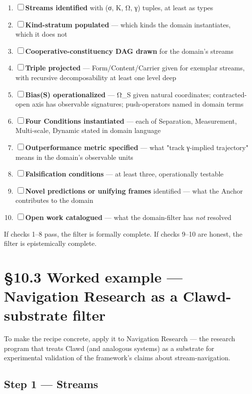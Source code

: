 \documentclass[11pt, openany]{book}
\newcommand{\sectionbreak}{\clearpage}
\begin{document}
\begin{enumerate}
\item ☐ \textbf{Streams identified} with (σ, K, Ω, γ) tuples, at least as types
\item ☐ \textbf{Kind-stratum populated} --- which kinds the domain instantiates, which it does not
\item ☐ \textbf{Cooperative-constituency DAG drawn} for the domain's streams
\item ☐ \textbf{Triple projected} --- Form/Content/Carrier given for exemplar streams, with recursive decomposability at least one level deep
\item ☐ \textbf{Bias(S) operationalized} --- Ω\_\allowbreak{}S given natural coordinates; contracted-open axis has observable signatures; push-operators named in domain terms
\item ☐ \textbf{Four Conditions instantiated} --- each of Separation, Measurement, Multi-scale, Dynamic stated in domain language
\item ☐ \textbf{Outperformance metric specified} --- what "track γ-implied trajectory" means in the domain's observable units
\item ☐ \textbf{Falsification conditions} --- at least three, operationally testable
\item ☐ \textbf{Novel predictions or unifying frames} identified --- what the Anchor contributes to the domain
\item ☐ \textbf{Open work catalogued} --- what the domain-filter has \textit{not} resolved
\end{enumerate}

If checks 1–8 pass, the filter is formally complete. If checks 9–10 are honest, the filter is epistemically complete.

\sectionbreak

\section{§10.3 Worked example --- Navigation Research as a Clawd-substrate filter}

To make the recipe concrete, apply it to Navigation Research --- the research program that treats Clawd (and analogous systems) as a substrate for experimental validation of the framework's claims about stream-navigation.

\subsection{Step 1 --- Streams}
\end{document}
